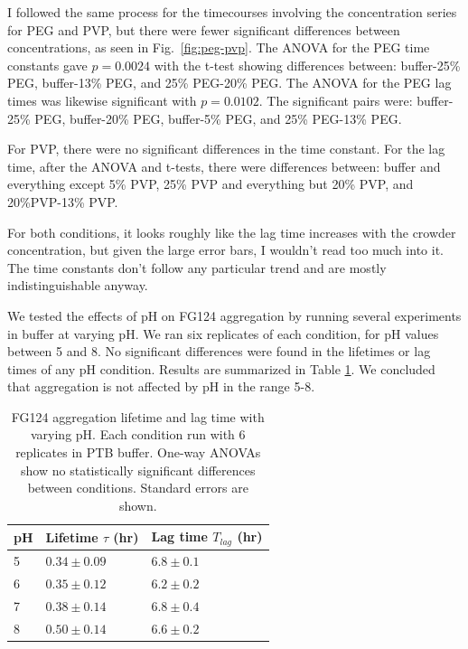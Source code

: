 I followed the same process for the timecourses involving the concentration series for PEG and PVP, but there were fewer significant differences between concentrations, as seen in Fig.~\ref{fig:peg-pvp}.  The ANOVA for the PEG time constants gave $p=0.0024$ with the t-test showing differences between: buffer-25\% PEG, buffer-13\% PEG, and 25\% PEG-20\% PEG. The ANOVA for the PEG lag times was likewise significant with $p = 0.0102$.  The significant pairs were: buffer-25\% PEG, buffer-20\% PEG, buffer-5\% PEG, and 25\% PEG-13\% PEG.

For PVP, there were no significant differences in the time constant.  For the lag time, after the ANOVA and t-tests, there were differences between: buffer and everything except 5\% PVP, 25\% PVP and everything but 20\% PVP, and 20\%PVP-13\% PVP.

For both conditions, it looks roughly like the lag time increases with the crowder concentration, but given the large error bars, I wouldn't read too much into it.  The time constants don't follow any particular trend and are mostly indistinguishable anyway.

We tested the effects of pH on FG124 aggregation by running several experiments in buffer at varying pH.  We ran six replicates of each condition, for pH values between 5 and 8.  No significant differences were found in the lifetimes or lag times of any pH condition.  Results are summarized in Table \ref{table:FG124-pH}. We concluded that aggregation is not affected by pH in the range 5-8.

\begin{table}[b!]
  \caption{FG124 aggregation lifetime and lag time with varying pH. Each condition run with 6 replicates in PTB buffer.  One-way ANOVAs show no statistically significant differences between conditions.  Standard errors are shown.}
    \label{table:FG124-pH}
    \begin{tabular}{p{1cm}p{3cm}p{3cm}}
      pH & Lifetime $\tau$ (hr) & Lag time $T_{lag}$ (hr) \\
      \hline
      5 & $0.34 \pm 0.09$ & $6.8 \pm 0.1$ \\
      6 & $0.35 \pm 0.12$ & $6.2 \pm 0.2$ \\
      7 & $0.38 \pm 0.14$ & $6.8 \pm 0.4$ \\
      8 & $0.50 \pm 0.14$ & $6.6 \pm 0.2$ \\
    \end{tabular}
\end{table}
